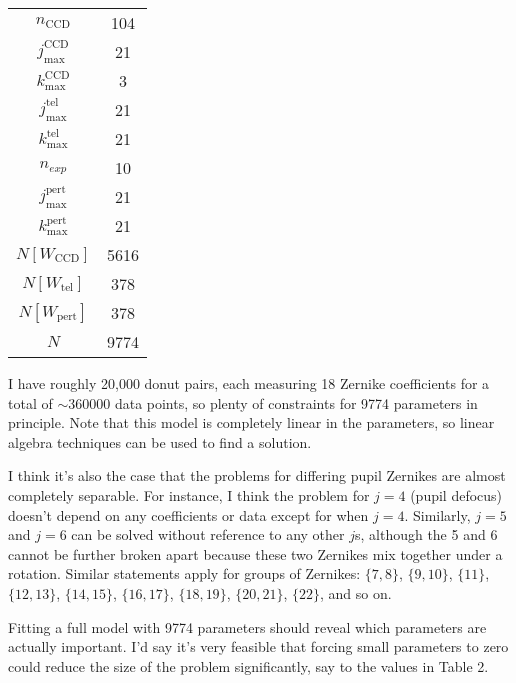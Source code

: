 \documentclass{article}
\begin{document}
\begin{table}[ht]
    \center
    \label{tab:1}
    \begin{tabular}{c|c}
        \hline
        $n_\mathrm{CCD}$ & 104 \\
        $j^\mathrm{CCD}_\mathrm{max}$ & 21 \\
        $k^\mathrm{CCD}_\mathrm{max}$ & 3 \\
        $j^\mathrm{tel}_\mathrm{max}$ & 21 \\
        $k^\mathrm{tel}_\mathrm{max}$ & 21 \\
        $n_{exp}$ & 10 \\
        $j^\mathrm{pert}_\mathrm{max}$ & 21 \\
        $k^\mathrm{pert}_\mathrm{max}$ & 21 \\
        \hline
        $N[W_\mathrm{CCD}]$ & 5616 \\
        $N[W_\mathrm{tel}]$ & 378 \\
        $N[W_\mathrm{pert}]$ & 378 \\
        \hline
        $N$ & 9774
    \end{tabular}
\end{table}

I have roughly 20,000 donut pairs, each measuring 18 Zernike coefficients for a total of $\sim
360000$ data points, so plenty of constraints for 9774 parameters in principle.  Note that this
model is completely linear in the parameters, so linear algebra techniques can be used to find a
solution.

I think it's also the case that the problems for differing pupil Zernikes are almost completely
separable.  For instance, I think the problem for $j=4$ (pupil defocus) doesn't depend on any
coefficients or data except for when $j=4$.  Similarly, $j=5$ and $j=6$ can be solved without
reference to any other $j$s, although the 5 and 6 cannot be further broken apart because these two
Zernikes mix together under a rotation.  Similar statements apply for groups of Zernikes: $\{7,
8\}$, $\{9,10\}$, $\{11\}$, $\{12,13\}$, $\{14,15\}$, $\{16, 17\}$, $\{18,19\}$, $\{20, 21\}$,
$\{22\}$, and so on.

Fitting a full model with 9774 parameters should reveal which parameters are actually important. I'd
say it's very feasible that forcing small parameters to zero could reduce the size of the problem
significantly, say to the values in Table 2.
\end{document}
